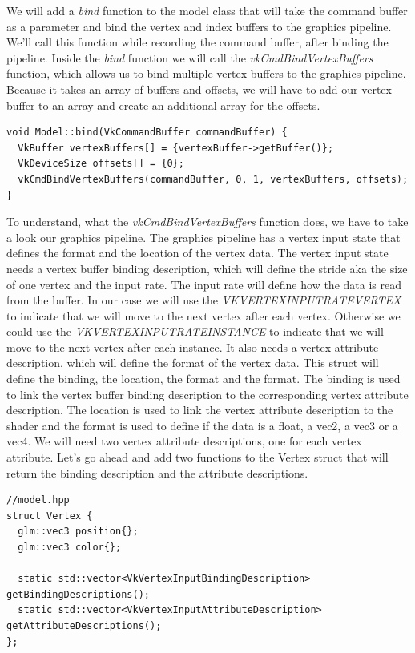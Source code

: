 \documentclass[12pt]{report} \usepackage{preamble}
\begin{document}
We will add a \textit{bind} function to the model class that will take the command buffer as a parameter and bind the vertex and index buffers to the graphics pipeline.
We'll call this function while recording the command buffer, after binding the pipeline. Inside the \textit{bind} function we will call the \textit{vkCmdBindVertexBuffers}
function, which allows us to bind multiple vertex buffers to the graphics pipeline. Because it takes an array of buffers and offsets, we will have to add our vertex buffer
to an array and create an additional array for the offsets.

\begin{lstlisting}[Language=C++]
void Model::bind(VkCommandBuffer commandBuffer) {
  VkBuffer vertexBuffers[] = {vertexBuffer->getBuffer()};
  VkDeviceSize offsets[] = {0};
  vkCmdBindVertexBuffers(commandBuffer, 0, 1, vertexBuffers, offsets);
}
\end{lstlisting}

To understand, what the \textit{vkCmdBindVertexBuffers} function does, we have to take a look our graphics pipeline.
The graphics pipeline has a vertex input state that defines the format and the location of the vertex data.
The vertex input state needs a vertex buffer binding description, which will define the stride aka the size of one vertex and the input rate.
The input rate will define how the data is read from the buffer.
In our case we will use the \textit{VK\textunderscore VERTEX\textunderscore INPUT\textunderscore RATE\textunderscore VERTEX} to indicate that
we will move to the next vertex after each vertex. Otherwise we could use the \textit{VK\textunderscore VERTEX\textunderscore INPUT\textunderscore RATE\textunderscore INSTANCE}
to indicate that we will move to the next vertex after each instance.
It also needs a vertex attribute description, which will define the format of the vertex data. This struct will define the binding, the location, the format and the format.
The binding is used to link the vertex buffer binding description to the corresponding vertex attribute description. The location is used to link the vertex attribute description to the shader
and the format is used to define if the data is a float, a vec2, a vec3 or a vec4. We will need two vertex attribute descriptions, one for each vertex attribute.
Let's go ahead and add two functions to the Vertex struct that will return the binding description and the attribute descriptions.

\begin{lstlisting}[Language=C++]
//model.hpp
struct Vertex {
  glm::vec3 position{};
  glm::vec3 color{};

  static std::vector<VkVertexInputBindingDescription> getBindingDescriptions();
  static std::vector<VkVertexInputAttributeDescription> getAttributeDescriptions();
};
\end{lstlisting}
\end{document}
